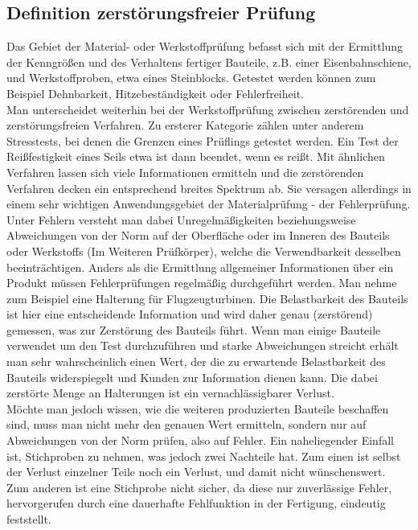 \documentclass[reducespace,stylepage,semiarbeit]{spezidoc}
\begin{document}
\subsection{Definition zerstörungsfreier Prüfung}
Das Gebiet der Material- oder Werkstoffprüfung befasst sich mit der Ermittlung der Kenngrößen und des Verhaltens fertiger Bauteile, z.B. einer Eisenbahnschiene, und Werkstoffproben, etwa eines Steinblocks. 
Getestet werden können zum Beispiel Dehnbarkeit, Hitzebeständigkeit oder Fehlerfreiheit.\\ 
Man unterscheidet weiterhin bei der Werkstoffprüfung zwischen zerstörenden und zerstörungsfreien Verfahren. 
Zu ersterer Kategorie zählen unter anderem Stresstests, bei denen die Grenzen eines Prüflings getestet werden. 
Ein Test der Reißfestigkeit eines Seils etwa ist dann beendet, wenn es reißt. 
Mit ähnlichen Verfahren lassen sich viele Informationen ermitteln und die zerstörenden Verfahren decken ein entsprechend breites Spektrum ab. 
Sie versagen allerdings in einem sehr wichtigen Anwendungsgebiet der Materialprüfung - der Fehlerprüfung.\\
Unter Fehlern versteht man dabei Unregelmäßigkeiten beziehungsweise Abweichungen von der Norm auf der Oberfläche oder im Inneren des Bauteils oder Werkstoffs (Im Weiteren Prüfkörper), welche die Verwendbarkeit desselben beeinträchtigen. 
Anders als die Ermittlung allgemeiner Informationen über ein Produkt müssen Fehlerprüfungen regelmäßig durchgeführt werden. 
Man nehme zum Beispiel eine Halterung für Flugzeugturbinen. 
Die Belastbarkeit des Bauteils ist hier eine entscheidende Information und wird daher genau (zerstörend) gemessen, was zur Zerstörung des Bauteils führt. 
Wenn man einige Bauteile verwendet um den Test durchzuführen und starke Abweichungen streicht erhält man sehr wahrscheinlich einen Wert, der die zu erwartende Belastbarkeit des Bauteils widerspiegelt und Kunden zur Information dienen kann. %
Die dabei zerstörte Menge an Halterungen ist ein vernachlässigbarer Verlust.\\
Möchte man jedoch wissen, wie die weiteren produzierten Bauteile beschaffen sind, muss man nicht mehr den genauen Wert ermitteln, sondern nur auf Abweichungen von der Norm prüfen, also auf Fehler. 
Ein naheliegender Einfall ist, Stichproben zu nehmen, was jedoch zwei Nachteile hat. Zum einen ist selbst der Verlust einzelner Teile noch ein Verlust, und damit nicht wünschenswert.
Zum anderen ist eine Stichprobe nicht sicher, da diese nur zuverlässige Fehler, hervorgerufen durch eine dauerhafte Fehlfunktion in der Fertigung, eindeutig feststellt.\\
\end{document}
